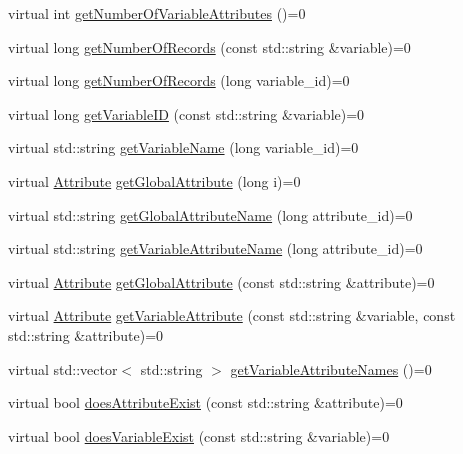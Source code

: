 \begin{DoxyCompactItemize}
\item 
virtual int \hyperlink{classccmc_1_1_file_reader_ad5c3584515c7f2896b49af21b2b15890}{get\-Number\-Of\-Variable\-Attributes} ()=0
\item 
virtual long \hyperlink{classccmc_1_1_file_reader_a6bed5da48bfcdf635a2f6cc71a1d5ca3}{get\-Number\-Of\-Records} (const std\-::string \&variable)=0
\item 
virtual long \hyperlink{classccmc_1_1_file_reader_a34a7240022397c1ee0efb71751ded69c}{get\-Number\-Of\-Records} (long variable\-\_\-id)=0
\item 
virtual long \hyperlink{classccmc_1_1_file_reader_a937185c6d323262f7c3f3c4d39b59e37}{get\-Variable\-I\-D} (const std\-::string \&variable)=0
\item 
virtual std\-::string \hyperlink{classccmc_1_1_file_reader_af688dd7824a25f91404e5f586d1ebe86}{get\-Variable\-Name} (long variable\-\_\-id)=0
\item 
virtual \hyperlink{classccmc_1_1_attribute}{Attribute} \hyperlink{classccmc_1_1_file_reader_a11885da1a8d6775a7d2764494474d067}{get\-Global\-Attribute} (long i)=0
\item 
virtual std\-::string \hyperlink{classccmc_1_1_file_reader_a7a4fc5909fce20cb6a40d0a1af56e9a1}{get\-Global\-Attribute\-Name} (long attribute\-\_\-id)=0
\item 
virtual std\-::string \hyperlink{classccmc_1_1_file_reader_ab901c44fdd1d8f7d4fac85f0747750ee}{get\-Variable\-Attribute\-Name} (long attribute\-\_\-id)=0
\item 
virtual \hyperlink{classccmc_1_1_attribute}{Attribute} \hyperlink{classccmc_1_1_file_reader_ac8c307cb70a6a99892e2538761867998}{get\-Global\-Attribute} (const std\-::string \&attribute)=0
\item 
virtual \hyperlink{classccmc_1_1_attribute}{Attribute} \hyperlink{classccmc_1_1_file_reader_ada8128e0f00555a8911be5e95ec18b6e}{get\-Variable\-Attribute} (const std\-::string \&variable, const std\-::string \&attribute)=0
\item 
virtual std\-::vector$<$ std\-::string $>$ \hyperlink{classccmc_1_1_file_reader_a6f11a946eac2b10674e948a3c3785966}{get\-Variable\-Attribute\-Names} ()=0
\item 
virtual bool \hyperlink{classccmc_1_1_file_reader_ac27cfdd9ceabe3af0f14b18fbebcafa5}{does\-Attribute\-Exist} (const std\-::string \&attribute)=0
\item 
virtual bool \hyperlink{classccmc_1_1_file_reader_ab8893f7d2b0f62041c37a788affe6b36}{does\-Variable\-Exist} (const std\-::string \&variable)=0

\end{DoxyCompactItemize}
